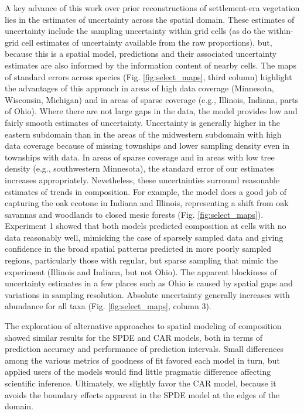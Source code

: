\documentclass[10pt,letterpaper]{article}
\begin{document}
A key advance of this work over prior reconstructions
of settlement-era vegetation lies in the estimates of uncertainty
across the spatial domain. These estimates of uncertainty include
the sampling uncertainty within grid cells (as do the within-grid
cell estimates of uncertainty available from the raw proportions),
but, because this is a spatial model, predictions and their associated
uncertainty estimates are also informed by the information content
of nearby cells. The maps of standard errors across species (Fig.
\ref{fig:select_maps}, third column) highlight the advantages of
this approach in areas of high data coverage (Minnesota, Wisconsin,
Michigan) and in areas of sparse coverage (e.g., Illinois, Indiana,
parts of Ohio). Where there are not large gaps in the data, the model
provides low and fairly smooth estimates of uncertainty. Uncertainty
is generally higher in the eastern subdomain than in the areas of
the midwestern subdomain with high data coverage because of missing
townships and lower sampling density even in townships with data.
In areas of sparse coverage and in areas with low tree density (e.g.,
southwestern Minnesota), the standard error of our estimates increases
appropriately. Nevetheless, these uncertainties surround reasonable
estimates of trends in composition. For example, the model does a
good job of capturing the oak ecotone in Indiana and Illinois, representing
a shift from oak savannas and woodlands to closed mesic forests (Fig.
\ref{fig:select_maps}). Experiment 1 showed that both models predicted
composition at cells with no data reasonably well, mimicking the case
of sparsely sampled data and giving confidence in the broad spatial
patterns predicted in more poorly sampled regions, particularly those
with regular, but sparse sampling that mimic the experiment (Illinois
and Indiana, but not Ohio). The apparent blockiness of uncertainty
estimates in a few places such as Ohio is caused by spatial gaps and
variations in sampling resolution. Absolute uncertainty generally
increases with abundance for all taxa (Fig. \ref{fig:select_maps},
column 3).

The exploration of alternative approaches to spatial
modeling of composition showed similar results for the SPDE and CAR
models, both in terms of prediction accuracy and performance of prediction
intervals. Small differences among the various metrics of goodness
of fit favored each model in turn, but applied users of the models
would find little pragmatic difference affecting scientific inference.
Ultimately, we slightly favor the CAR model, because it avoids the
boundary effects apparent in the SPDE model at the edges of the domain.
\end{document}
